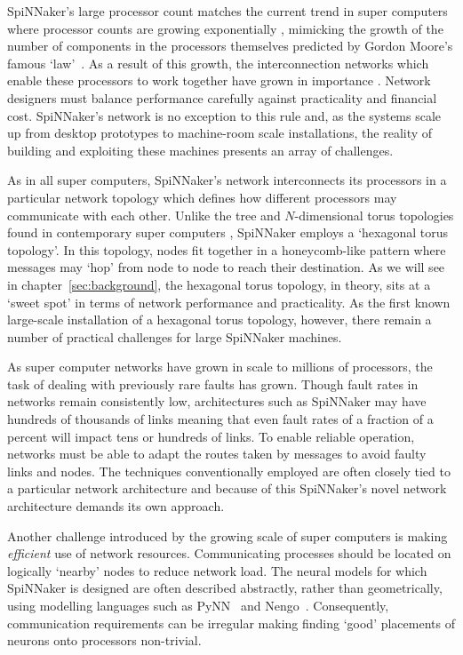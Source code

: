 SpiNNaker's large processor count matches the current trend in super computers
where processor counts are growing exponentially \cite{meuer16j}, mimicking the
growth of the number of components in the processors themselves predicted by
Gordon Moore's famous `law'~\cite{moore75}. As a result of this growth, the
interconnection networks which enable these processors to work together have
grown in importance \cite{dally01}. Network designers must balance performance
carefully against practicality and financial cost.  SpiNNaker's network is no
exception to this rule and, as the systems scale up from desktop prototypes to
machine-room scale installations, the reality of building and exploiting these
machines presents an array of challenges.

As in all super computers, SpiNNaker's network interconnects its processors in
a particular network topology which defines how different processors may
communicate with each other. Unlike the tree and $N$-dimensional torus
topologies found in contemporary super computers \cite[chapter~3]{dally04},
SpiNNaker employs a `hexagonal torus topology'. In this topology, nodes fit
together in a honeycomb-like pattern where messages may `hop' from node to node
to reach their destination. As we will see in chapter~\ref{sec:background}, the
hexagonal torus topology, in theory, sits at a `sweet spot' in terms of network
performance and practicality. As the first known large-scale installation of a
hexagonal torus topology, however, there remain a number of practical
challenges for large SpiNNaker machines.

As super computer networks have grown in scale to millions of processors, the
task of dealing with previously rare faults has grown.  Though fault rates in
networks remain consistently low, architectures such as SpiNNaker may have
hundreds of thousands of links meaning that even fault rates of a fraction of a
percent will impact tens or hundreds of links. To enable reliable operation,
networks must be able to adapt the routes taken by messages to avoid faulty
links and nodes. The techniques conventionally employed are often closely tied
to a particular network architecture and because of this SpiNNaker's novel
network architecture demands its own approach.

Another challenge introduced by the growing scale of super computers is making
\emph{efficient} use of network resources. Communicating processes should be
located on logically `nearby' nodes to reduce network load. The neural models
for which SpiNNaker is designed are often described abstractly, rather than
geometrically, using modelling languages such as PyNN~\cite{davison08} and
Nengo~\cite{eliasmith04}.  Consequently, communication requirements can be
irregular making finding `good' placements of neurons onto processors
non-trivial.


